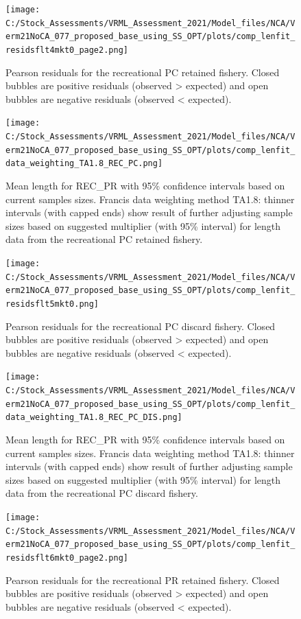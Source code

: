 \documentclass[11pt,
  english,
  a4paper,
]{article}
\begin{document}
\begin{figure}
\centering
\texttt{[image: C:/Stock\_Assessments/VRML\_Assessment\_2021/Model\_files/NCA/Verm21NoCA\_077\_proposed\_base\_using\_SS\_OPT/plots/comp\_lenfit\_residsflt4mkt0\_page2.png]}
\caption{Pearson residuals for the recreational PC retained fishery. Closed bubbles are positive residuals (observed \textgreater{} expected) and open bubbles are negative residuals (observed \textless{} expected).\label{fig:len-pearson-REC-PC}}
\end{figure}

\begin{figure}
\centering
\texttt{[image: C:/Stock\_Assessments/VRML\_Assessment\_2021/Model\_files/NCA/Verm21NoCA\_077\_proposed\_base\_using\_SS\_OPT/plots/comp\_lenfit\_data\_weighting\_TA1.8\_REC\_PC.png]}
\caption{Mean length for REC\_PR with 95\% confidence intervals based on current samples sizes. Francis data weighting method TA1.8: thinner intervals (with capped ends) show result of further adjusting sample sizes based on suggested multiplier (with 95\% interval) for length data from the recreational PC retained fishery.\label{fig:mean-len-fit-REC-PC}}
\end{figure}

\begin{figure}
\centering
\texttt{[image: C:/Stock\_Assessments/VRML\_Assessment\_2021/Model\_files/NCA/Verm21NoCA\_077\_proposed\_base\_using\_SS\_OPT/plots/comp\_lenfit\_residsflt5mkt0.png]}
\caption{Pearson residuals for the recreational PC discard fishery. Closed bubbles are positive residuals (observed \textgreater{} expected) and open bubbles are negative residuals (observed \textless{} expected).\label{fig:len-pearson-REC-PC-DIS}}
\end{figure}

\begin{figure}
\centering
\texttt{[image: C:/Stock\_Assessments/VRML\_Assessment\_2021/Model\_files/NCA/Verm21NoCA\_077\_proposed\_base\_using\_SS\_OPT/plots/comp\_lenfit\_data\_weighting\_TA1.8\_REC\_PC\_DIS.png]}
\caption{Mean length for REC\_PR with 95\% confidence intervals based on current samples sizes. Francis data weighting method TA1.8: thinner intervals (with capped ends) show result of further adjusting sample sizes based on suggested multiplier (with 95\% interval) for length data from the recreational PC discard fishery.\label{fig:mean-len-fit-REC-PC-DIS}}
\end{figure}

\begin{figure}
\centering
\texttt{[image: C:/Stock\_Assessments/VRML\_Assessment\_2021/Model\_files/NCA/Verm21NoCA\_077\_proposed\_base\_using\_SS\_OPT/plots/comp\_lenfit\_residsflt6mkt0\_page2.png]}
\caption{Pearson residuals for the recreational PR retained fishery. Closed bubbles are positive residuals (observed \textgreater{} expected) and open bubbles are negative residuals (observed \textless{} expected).\label{fig:len-pearson-REC-PR}}
\end{figure}
\end{document}
